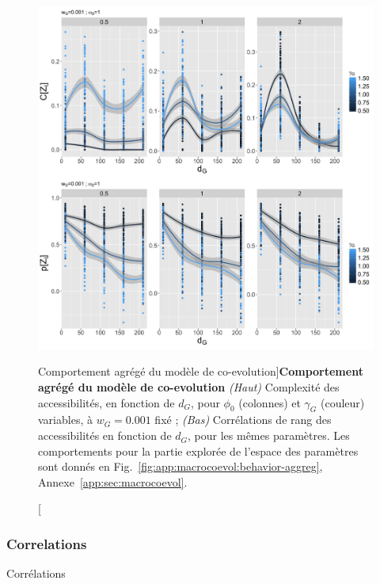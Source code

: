 \begin{figure}
\includegraphics[width=\linewidth]{Figures/Final/6-2-2-fig-macrocoevol-behavior-aggreg.jpg}
\caption[Agregated behavior of the co-evolution model][Comportement agrégé du modèle de co-evolution]{}{\textbf{Comportement agrégé du modèle de co-evolution} \textit{(Haut)} Complexité des accessibilités, en fonction de $d_G$, pour $\phi_0$ (colonnes) et $\gamma_G$ (couleur) variables, à $w_G = 0.001$ fixé ; \textit{(Bas)} Corrélations de rang des accessibilités en fonction de $d_G$, pour les mêmes paramètres. Les comportements pour la partie explorée de l'espace des paramètres sont donnés en Fig.~\ref{fig:app:macrocoevol:behavior-aggreg}, Annexe~\ref{app:sec:macrocoevol}.\label{fig:macrocoevol:behavior-aggreg}}
\end{figure}



\subsubsection{Correlations}{Corrélations}



